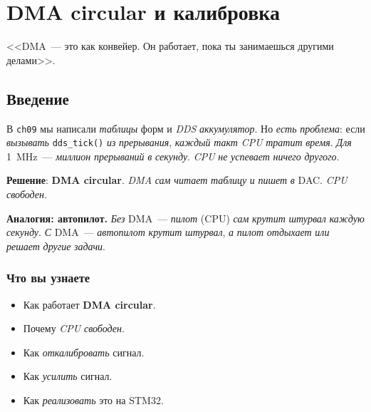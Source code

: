 
\chapter{DMA circular и калибровка}
\label{ch:dac-dma}

\epigraph{<<DMA~--- это как конвейер. Он работает, пока ты
занимаешься другими делами>>.}{}

\section{Введение}
\label{sec:dac-dma-intro}

В \texttt{ch09} мы написали \emph{таблицы} форм и
\emph{DDS} \emph{аккумулятор}. Но \emph{есть} \emph{проблема}:
если \emph{вызывать} \texttt{dds\_tick()} \emph{из}
\emph{прерывания}, \emph{каждый} \emph{такт} \emph{CPU}
\emph{тратит} \emph{время}. \emph{Для} \SI{1}{\mega\hertz}~---
\emph{миллион} \emph{прерываний} \emph{в} \emph{секунду}.
\emph{CPU} \emph{не} \emph{успевает} \emph{ничего} \emph{другого}.

\textbf{Решение}: \textbf{DMA circular}. \emph{DMA} \emph{сам}
\emph{читает} \emph{таблицу} \emph{и} \emph{пишет} \emph{в} DAC.
\emph{CPU} \emph{свободен}.

\begin{ideabox}
\textbf{Аналогия: автопилот.} \emph{Без} DMA~--- \emph{пилот}
(CPU) \emph{сам} \emph{крутит} \emph{штурвал} \emph{каждую}
\emph{секунду}. \emph{С} DMA~--- \emph{автопилот} \emph{крутит}
\emph{штурвал}, \emph{а} \emph{пилот} \emph{отдыхает} \emph{или}
\emph{решает} \emph{другие} \emph{задачи}.
\end{ideabox}

\subsection{Что вы узнаете}

\begin{itemize}
    \item Как работает \textbf{DMA circular}.
    \item Почему \emph{CPU} \emph{свободен}.
    \item Как \emph{откалибровать} сигнал.
    \item Как \emph{усилить} сигнал.
    \item Как \emph{реализовать} это на STM32.
\end{itemize}

